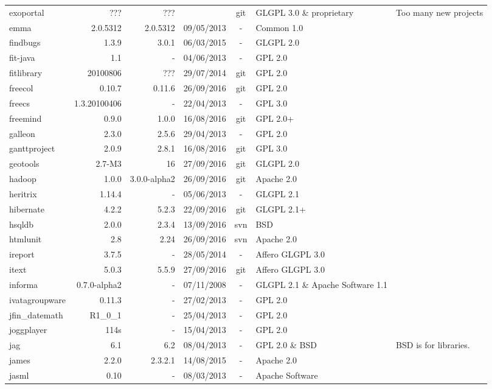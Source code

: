 \documentclass{sig-alternate-05-2015}
\begin{document}
\begin{table}
\begin{tabular}{l|r|r|c|c|p{3cm}|p{3cm}}
			exoportal & ??? & ??? &  & git & GLGPL 3.0 \& proprietary & Too many new projects \\
			emma & 2.0.5312 & 2.0.5312 & 09/05/2013  & - & Common   1.0 & \\
			findbugs & 1.3.9 & 3.0.1 & 06/03/2015 & - & GLGPL 2.0 & \\
			fit-java & 1.1 & - & 04/06/2013 & - & GPL 2.0 & \\
			fitlibrary & 20100806 & ??? & 29/07/2014 & git & GPL 2.0 & \\
			freecol & 0.10.7 & 0.11.6 & 26/09/2016 & git & GPL 2.0 &  \\
			freecs & 1.3.20100406 & - & 22/04/2013 & - & GPL 3.0 &   \\
			freemind & 0.9.0 & 1.0.0 & 16/08/2016 & git & GPL 2.0+ &  \\
			galleon & 2.3.0 & 2.5.6 & 29/04/2013 & - & GPL 2.0 & \\
			ganttproject & 2.0.9 & 2.8.1 & 16/08/2016 & git & GPL 3.0 &  \\
			geotools & 2.7-M3 & 16 & 27/09/2016 & git & GLGPL 2.0 & \\
			hadoop & 1.0.0 & 3.0.0-alpha2 & 26/09/2016 & git & Apache 2.0 & \\
			heritrix & 1.14.4 & - & 05/06/2013 & - & GLGPL 2.1 & \\
			hibernate & 4.2.2 & 5.2.3 & 22/09/2016 & git & GLGPL 2.1+ & \\
			hsqldb & 2.0.0 & 2.3.4 & 13/09/2016 & svn & BSD  & \\
			htmlunit & 2.8 & 2.24 & 26/09/2016 & svn & Apache 2.0 & \\
			ireport & 3.7.5 & - & 28/05/2014 & - & Affero GLGPL 3.0 & \\
			itext & 5.0.3 & 5.5.9 & 27/09/2016 & git & Affero GLGPL 3.0 & \\
			informa & 0.7.0-alpha2 & - & 07/11/2008 & - & GLGPL 2.1 \& Apache Software 1.1 & \\
			ivatagroupware & 0.11.3 & - & 27/02/2013 & - & GPL 2.0 & \\
			jfin\_datemath & R1\_0\_1 & - & 25/04/2013 & - & GPL 2.0 & \\
			joggplayer & 114s & - &  15/04/2013 & - & GPL 2.0 & \\
			jag & 6.1 & 6.2 & 08/04/2013  & - & GPL 2.0 \& BSD  & BSD  is for libraries. \\
			james & 2.2.0 & 2.3.2.1 & 14/08/2015 & - & Apache 2.0 & \\
			jasml & 0.10 & - & 08/03/2013 & - & Apache Software  & \\

\end{tabular}
\end{table}
\end{document}
